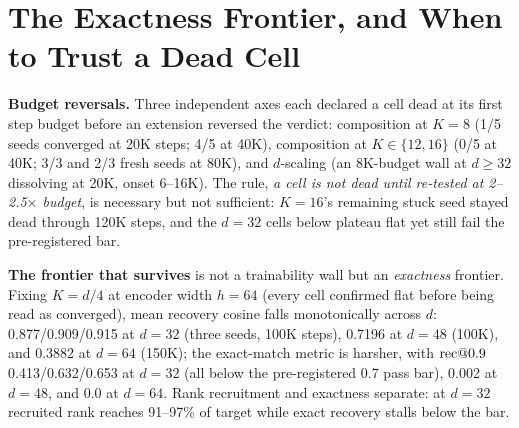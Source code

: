 \section{The Exactness Frontier, and When to Trust a Dead Cell}
\label{sec:frontier}

\textbf{Budget reversals.} Three independent axes each declared a cell
dead at its first step budget before an extension reversed the verdict:
composition at $K{=}8$ (1/5 seeds converged at 20K steps; 4/5 at 40K),
composition at $K \in \{12, 16\}$ (0/5 at 40K; 3/3 and 2/3 fresh seeds
at 80K),
and $d$-scaling (an 8K-budget wall at $d \geq 32$ dissolving at 20K,
onset 6--16K).
The rule, \emph{a cell is not dead until re-tested at 2--2.5$\times$
budget},
is necessary but not sufficient: $K{=}16$'s remaining stuck
seed stayed dead through 120K steps,
and the $d{=}32$ cells below plateau flat yet still fail the
pre-registered bar.

\textbf{The frontier that survives} is not a trainability wall but an
\emph{exactness} frontier. Fixing $K = d/4$ at encoder width $h = 64$
(every cell confirmed flat before being read as converged), mean
recovery cosine falls monotonically across $d$:
0.877/0.909/0.915 at $d{=}32$ (three
seeds, 100K steps), 0.7196 at $d{=}48$ (100K), and 0.3882 at $d{=}64$
(150K); the exact-match metric is harsher, with $\mathrm{rec}@0.9$
0.413/0.632/0.653 at $d{=}32$ (all below the pre-registered 0.7 pass
bar), 0.002 at $d{=}48$, and 0.0 at $d{=}64$.
Rank recruitment and exactness separate: at $d{=}32$ recruited rank
reaches 91--97\% of target while exact recovery stalls below the bar.
